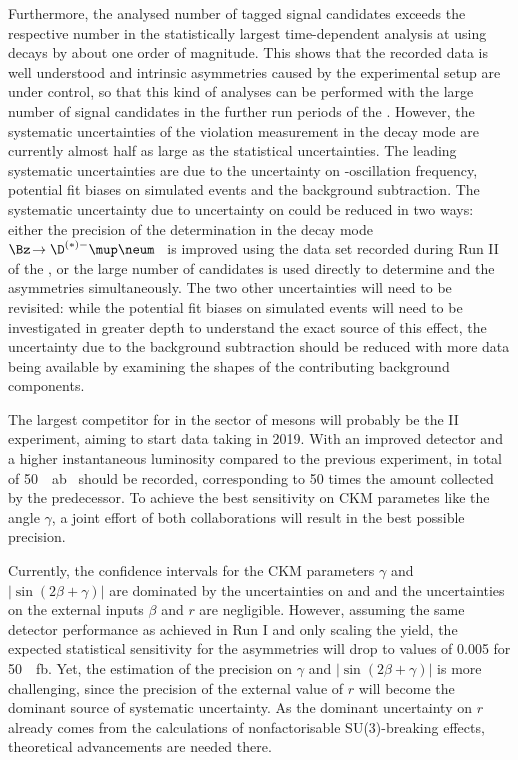 Furthermore, the analysed number of tagged signal candidates exceeds the respective number in the statistically largest time-dependent \CP analysis at \lhcb using \BdToJPsiKS decays by about one order of magnitude.
This shows that the recorded data is well understood and intrinsic asymmetries caused by \eg the experimental setup are under control, so that this kind of analyses can be performed with the large number of signal candidates in the further run periods of the \lhc.
However, the systematic uncertainties of the \CP violation measurement in the decay mode \mbox{\BdToDpi} are currently almost half as large as the statistical uncertainties.
The leading systematic uncertainties are due to the uncertainty on \Bz-oscillation frequency, potential fit biases on simulated events and the background subtraction.
The systematic uncertainty due to uncertainty on \dm could be reduced in two ways: either the precision of the determination in the decay mode \mbox{$\Bz\!\to\D^{(*)-}\mup\neum$}~\cite{Aaij:2016fdk} is improved using the data set recorded during Run II of the \lhc, or the large number of \BdToDpi candidates is used directly to determine \dm and the \CP asymmetries simultaneously.
The two other uncertainties will need to be revisited: while the potential fit biases on simulated events will need to be investigated in greater depth to understand the exact source of this effect, the uncertainty due to the background subtraction should be reduced with more data being available by examining the shapes of the contributing background components.

The largest competitor for \lhcb in the sector of \B mesons will probably be the \belle II experiment, aiming to start data taking in \num{2019}.
With an improved detector and a higher instantaneous luminosity compared to the previous \belle experiment, in total of \SI{50}{\per\atto\barn}~\cite{Abe:2010gxa} should be recorded, corresponding to \num{50} times the amount collected by the predecessor.
To achieve the best sensitivity on CKM parametes like the angle $\gamma$, a joint effort of both collaborations will result in the best possible precision.

Currently, the confidence intervals for the CKM parameters $\gamma$ and $\left|\sin\!\left(2\beta+\gamma\right)\right|$ are dominated by the uncertainties on \Sf and \Sfbar and the uncertainties on the external inputs $\beta$ and $r$ are negligible.
However, assuming the same detector performance as achieved in Run I and only scaling the \BdToDpi yield, the expected statistical sensitivity for the \CP asymmetries will drop to values of \eg \num{0.005} for \SI{50}{\per\femto\barn}.
Yet, the estimation of the precision on $\gamma$ and $\left|\sin\!\left(2\beta+\gamma\right)\right|$ is more challenging, since the precision of the external value of $r$ will become the dominant source of systematic uncertainty. As the dominant uncertainty on $r$ already comes from the calculations of nonfactorisable SU(3)-breaking effects, theoretical advancements are needed there.
